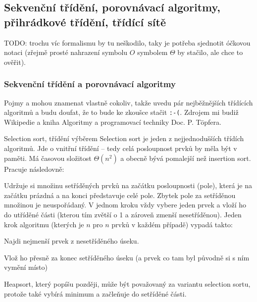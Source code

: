 \subsection{Sekvenční třídění, porovnávací algoritmy, přihrádkové třídění, třídící sítě}

TODO: trochu víc formalismu by tu neškodilo, taky je potřeba sjednotit óčkovou notaci (zřejmě prosté nahrazení symbolu $O$ symbolem $\Theta$ by stačilo, ale chce to ověřit).

\subsubsection*{Sekvenční třídění a porovnávací algoritmy}

Pojmy  a  mohou znamenat vlastně cokoliv, takže uvedu pár nejběžnějších třídících algoritmů a budu doufat, že to bude ke zkoušce stačit \texttt{:-(}. Zdrojem mi budiž Wikipedie a kniha Algoritmy a programovací techniky Doc. P. Töpfera.

\bigskip

\begin{algoritmusN}{Selection sort, třídění výběrem}
Selection sort je jeden z nejjednodušších třídích algoritmů. Jde o vnitřní třídění -- tedy celá posloupnost prvků by měla být v paměti. Má časovou složitost $\Theta(n^2)$ a obecně bývá pomalejší než insertion sort. Pracuje následovně:

Udržuje si množinu setříděných prvků na začátku posloupnosti (pole), která je na začátku prázdná a na konci představuje celé pole. Zbytek pole za setříděnou množinou je neuspořádaný. V jednom kroku vždy vybere jeden prvek a vloží ho do utříděné části (kterou tím zvětší o 1 a zároveň zmenší nesetříděnou). Jeden krok algoritmu (kterých je $n$ pro $n$ prvků v každém případě) vypadá takto: 
\begin{penumerate}
    \item Najdi nejmenší prvek z nesetříděného úseku.
    \item Vlož ho přesně za konec setříděného úseku (a prvek co tam byl původně si s ním vymění místo)
\end{penumerate}

Heapsort, který popíšu později, může být považovaný za variantu selection sortu, protože také vybírá minimum a začleňuje do setříděné části.
\end{algoritmusN}

